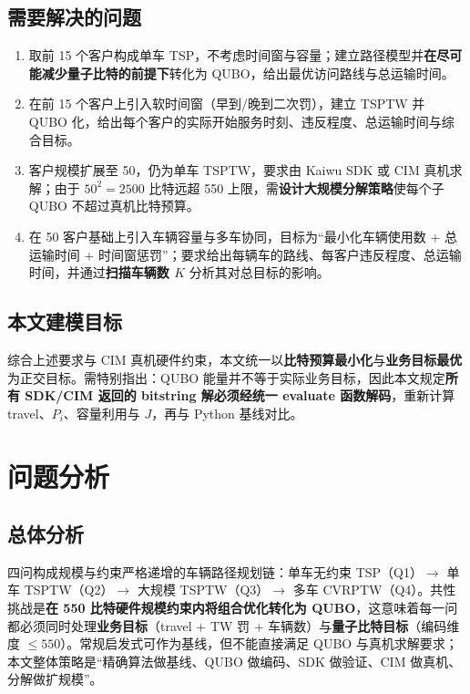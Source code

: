 \documentclass[UTF8,12pt,a4paper]{ctexart}
\begin{document}
\subsection{需要解决的问题}

\begin{enumerate}
    \item[\textbf{问题一}] 取前 15 个客户构成单车 TSP，不考虑时间窗与容量；建立路径模型并\textbf{在尽可能减少量子比特的前提下}转化为 QUBO，给出最优访问路线与总运输时间。
    \item[\textbf{问题二}] 在前 15 个客户上引入软时间窗（早到/晚到二次罚），建立 TSPTW 并 QUBO 化，给出每个客户的实际开始服务时刻、违反程度、总运输时间与综合目标。
    \item[\textbf{问题三}] 客户规模扩展至 50，仍为单车 TSPTW，要求由 Kaiwu SDK 或 CIM 真机求解；由于 $50^{2}=2500$ 比特远超 550 上限，需\textbf{设计大规模分解策略}使每个子 QUBO 不超过真机比特预算。
    \item[\textbf{问题四}] 在 50 客户基础上引入车辆容量与多车协同，目标为``最小化车辆使用数 $+$ 总运输时间 $+$ 时间窗惩罚''；要求给出每辆车的路线、每客户违反程度、总运输时间，并通过\textbf{扫描车辆数 $K$} 分析其对总目标的影响。
\end{enumerate}

\subsection{本文建模目标}

综合上述要求与 CIM 真机硬件约束，本文统一以\textbf{比特预算最小化}与\textbf{业务目标最优}为正交目标。需特别指出：QUBO 能量并不等于实际业务目标，因此本文规定\textbf{所有 SDK/CIM 返回的 bitstring 解必须经统一 evaluate 函数解码}，重新计算 travel、$P_i$、容量利用与 $J$，再与 Python 基线对比。

\section{问题分析}

\subsection{总体分析}

四问构成规模与约束严格递增的车辆路径规划链：单车无约束 TSP（Q1）$\rightarrow$ 单车 TSPTW（Q2）$\rightarrow$ 大规模 TSPTW（Q3）$\rightarrow$ 多车 CVRPTW（Q4）。共性挑战是\textbf{在 550 比特硬件规模约束内将组合优化转化为 QUBO}，这意味着每一问都必须同时处理\textbf{业务目标}（travel $+$ TW 罚 $+$ 车辆数）与\textbf{量子比特目标}（编码维度 $\le 550$）。常规启发式可作为基线，但不能直接满足 QUBO 与真机求解要求；本文整体策略是``精确算法做基线、QUBO 做编码、SDK 做验证、CIM 做真机、分解做扩规模''。
\end{document}

